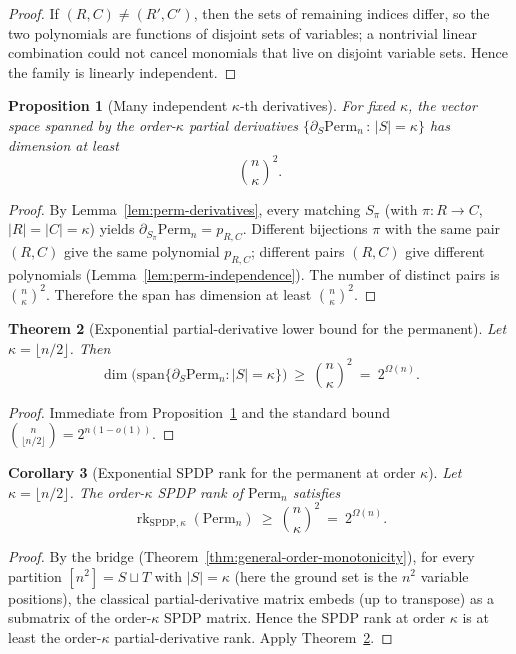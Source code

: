 \documentclass[12pt]{article}
\newtheorem{theorem}{Theorem}
\newtheorem{proposition}[theorem]{Proposition}
\newtheorem{corollary}[theorem]{Corollary}
\theoremstyle{definition}
\theoremstyle{definition}
\theoremstyle{remark}
\theoremstyle{remark}
\begin{document}
\begin{proof}
If $(R,C)\neq(R',C')$, then the sets of remaining indices differ, so the two polynomials are functions of disjoint sets of variables; a nontrivial linear combination could not cancel monomials that live on disjoint variable sets. Hence the family is linearly independent.
\end{proof}

\begin{proposition}[Many independent $\kappa$-th derivatives]\label{prop:perm-many-derivatives}
For fixed $\kappa$, the vector space spanned by the order-$\kappa$ partial derivatives $\{\partial_S\mathrm{Perm}_n\,:\,|S|=\kappa\}$ has dimension at least
\[
\binom{n}{\kappa}^2.
\]
\end{proposition}

\begin{proof}
By Lemma~\ref{lem:perm-derivatives}, every matching $S_\pi$ (with $\pi: R\to C$, $|R|=|C|=\kappa$) yields $\partial_{S_\pi}\mathrm{Perm}_n=p_{R,C}$. Different bijections $\pi$ with the same pair $(R,C)$ give the same polynomial $p_{R,C}$; different pairs $(R,C)$ give different polynomials (Lemma~\ref{lem:perm-independence}). The number of distinct pairs is $\binom{n}{\kappa}^2$. Therefore the span has dimension at least $\binom{n}{\kappa}^2$.
\end{proof}

\begin{theorem}[Exponential partial-derivative lower bound for the permanent]\label{thm:perm-partial-derivative-lb}
Let $\kappa=\lfloor n/2\rfloor$. Then
\[
\dim\bigl(\mathrm{span}\{\partial_S\mathrm{Perm}_n: |S|=\kappa\}\bigr)\ \ge\ \binom{n}{\kappa}^2\ =\ 2^{\Omega(n)}.
\]
\end{theorem}

\begin{proof}
Immediate from Proposition~\ref{prop:perm-many-derivatives} and the standard bound $\binom{n}{\lfloor n/2\rfloor}=2^{n(1-o(1))}$.
\end{proof}

\begin{corollary}[Exponential SPDP rank for the permanent at order $\kappa$]\label{cor:perm-spdp-lb}
Let $\kappa=\lfloor n/2\rfloor$. The order-$\kappa$ SPDP rank of $\mathrm{Perm}_n$ satisfies
\[
\operatorname{rk}_{\mathrm{SPDP},\kappa}(\mathrm{Perm}_n)\ \ge\ \binom{n}{\kappa}^2\ =\ 2^{\Omega(n)}.
\]
\end{corollary}

\begin{proof}
By the bridge (Theorem~\ref{thm:general-order-monotonicity}), for every partition $[n^2]=S\sqcup T$ with $|S|=\kappa$ (here the ground set is the $n^2$ variable positions), the classical partial-derivative matrix embeds (up to transpose) as a submatrix of the order-$\kappa$ SPDP matrix. Hence the SPDP rank at order $\kappa$ is at least the order-$\kappa$ partial-derivative rank. Apply Theorem~\ref{thm:perm-partial-derivative-lb}.
\end{proof}
\end{document}
